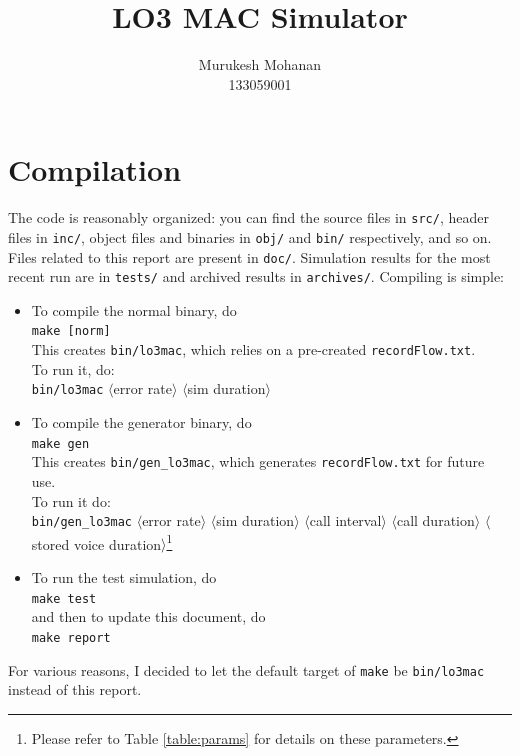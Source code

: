 \documentclass[a4]{article}
\begin{document}
\title{LO3 MAC Simulator}
\author{Murukesh Mohanan\\133059001}
\maketitle
\section{Compilation}
The code is reasonably organized: you can find the source files in \texttt{src/}, 
header files in \texttt{inc/}, object files and binaries in \texttt{obj/} and 
\texttt{bin/} respectively, and so on. Files related to this report are present 
in \texttt{doc/}. Simulation results for the most recent run are in
\texttt{tests/} and archived results in \texttt{archives/}. 
Compiling is simple:
\begin{itemize}
	\item To compile the normal binary, do \\
		\texttt{make [norm]}  \\
		This creates \texttt{bin/lo3mac}, which relies on a 
		pre-created \texttt{recordFlow.txt}.\\
		To run it, do: \\
		\texttt{bin/lo3mac} $\langle$error rate$\rangle$ 
			$\langle$sim duration$\rangle$
	\item To compile the generator binary, do \\
		\texttt{make gen} \\
		This creates \texttt{bin/gen\_lo3mac}, which generates 
		\texttt{recordFlow.txt} for future use.\\
		To run it do: \\
		\texttt{bin/gen\_lo3mac} $\langle$error rate$\rangle$ 
			$\langle$sim duration$\rangle$ $\langle$call interval$\rangle$
			$\langle$call duration$\rangle$ 
			$\langle$stored voice duration$\rangle$\footnote{Please refer to Table \ref{table:params} for details on these parameters.}
	\item To run the test simulation, do \\
		\texttt{make test}\\
		and then to update this document, do \\
		\texttt{make report}
\end{itemize}
For various reasons, I decided to let the default target of \texttt{make}
be \texttt{bin/lo3mac} instead of this report.
\end{document}
